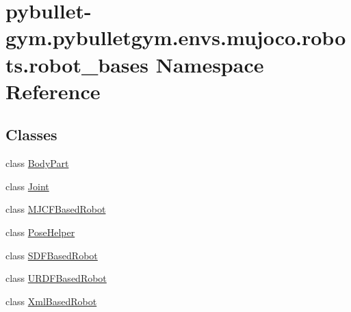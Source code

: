 \hypertarget{namespacepybullet-gym_1_1pybulletgym_1_1envs_1_1mujoco_1_1robots_1_1robot__bases}{}\section{pybullet-\/gym.pybulletgym.\+envs.\+mujoco.\+robots.\+robot\+\_\+bases Namespace Reference}
\label{namespacepybullet-gym_1_1pybulletgym_1_1envs_1_1mujoco_1_1robots_1_1robot__bases}
\subsection*{Classes}
\begin{DoxyCompactItemize}
\item 
class \hyperlink{classpybullet-gym_1_1pybulletgym_1_1envs_1_1mujoco_1_1robots_1_1robot__bases_1_1_body_part}{Body\+Part}
\item 
class \hyperlink{classpybullet-gym_1_1pybulletgym_1_1envs_1_1mujoco_1_1robots_1_1robot__bases_1_1_joint}{Joint}
\item 
class \hyperlink{classpybullet-gym_1_1pybulletgym_1_1envs_1_1mujoco_1_1robots_1_1robot__bases_1_1_m_j_c_f_based_robot}{M\+J\+C\+F\+Based\+Robot}
\item 
class \hyperlink{classpybullet-gym_1_1pybulletgym_1_1envs_1_1mujoco_1_1robots_1_1robot__bases_1_1_pose_helper}{Pose\+Helper}
\item 
class \hyperlink{classpybullet-gym_1_1pybulletgym_1_1envs_1_1mujoco_1_1robots_1_1robot__bases_1_1_s_d_f_based_robot}{S\+D\+F\+Based\+Robot}
\item 
class \hyperlink{classpybullet-gym_1_1pybulletgym_1_1envs_1_1mujoco_1_1robots_1_1robot__bases_1_1_u_r_d_f_based_robot}{U\+R\+D\+F\+Based\+Robot}
\item 
class \hyperlink{classpybullet-gym_1_1pybulletgym_1_1envs_1_1mujoco_1_1robots_1_1robot__bases_1_1_xml_based_robot}{Xml\+Based\+Robot}
\end{DoxyCompactItemize}
